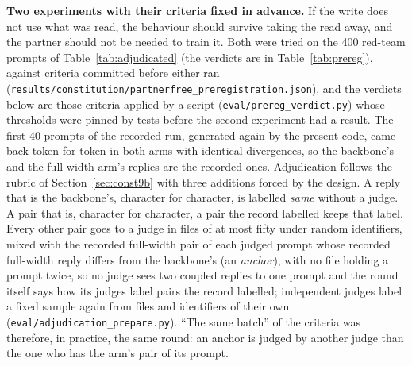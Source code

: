 \documentclass[11pt]{article}
\newcommand{\code}[1]{\texttt{#1}}
\begin{document}
\textbf{Two experiments with their criteria fixed in advance.} If the write does
not use what was read, the behaviour should survive taking the read away, and the
partner should not be needed to train it. Both were tried on the 400 red-team
prompts of Table~\ref{tab:adjudicated} (the verdicts are in
Table~\ref{tab:prereg}), against criteria committed before either
ran (\code{results/\allowbreak{}constitution/\allowbreak{}partnerfree\_\allowbreak{}preregistration.json}), and the verdicts
below are those criteria applied by a script
(\code{eval/\allowbreak{}prereg\_verdict.py}) whose thresholds were pinned by tests before the
second experiment had a result. The first 40 prompts of the recorded run, generated
again by the present code, came back token for token in both arms with identical
divergences, so the backbone's and the full-width arm's replies are the recorded
ones. Adjudication follows the rubric of Section~\ref{sec:const9b} with three
additions forced by the design. A reply that is the backbone's, character for
character, is labelled \emph{same} without a judge. A pair that is, character for
character, a pair the record labelled keeps that label. Every other pair goes to a
judge in files of at most fifty under random identifiers, mixed with the recorded
full-width pair of each judged prompt whose recorded full-width reply differs from
the backbone's (an \emph{anchor}), with no file holding a
prompt twice, so no judge sees two coupled replies to one prompt and the round
itself says how its judges label pairs the record labelled; independent judges
label a fixed sample again from files and identifiers of their own
(\code{eval/\allowbreak{}adjudication\_prepare.py}). ``The same batch'' of the criteria was
therefore, in practice, the same round: an anchor is judged by another judge than
the one who has the arm's pair of its prompt.
\end{document}
